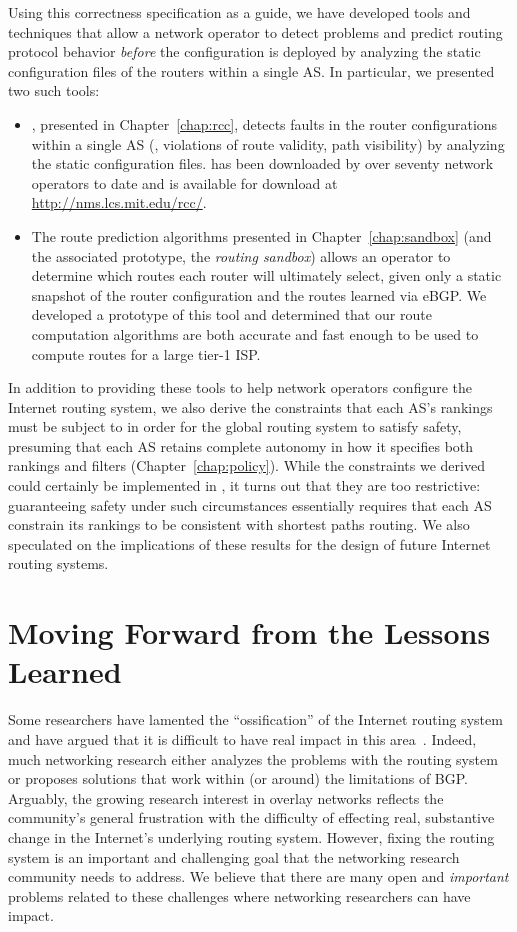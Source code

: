 Using this correctness specification as a guide, we have developed tools
and techniques that allow a network operator to detect problems and
predict routing protocol behavior {\em before} the configuration is deployed by
analyzing the static configuration files of the routers within a single
AS.  In particular, we presented two such tools:

\begin{itemize}
\itemsep=-1pt
\item \rcc, presented in Chapter~\ref{chap:rcc}, detects faults in the router
configurations within a single 
AS (\ie, violations of route validity, path visibility) by
analyzing the static configuration files.  \rcc has been downloaded by
over seventy network operators to date and is available for download at
\url{http://nms.lcs.mit.edu/rcc/}.
%
\item The route prediction algorithms presented in
Chapter~\ref{chap:sandbox} (and the associated prototype, the {\em routing
sandbox}) allows an operator to determine which routes each router will
ultimately select, given only a static snapshot of the router
configuration and the routes learned via eBGP.  We developed a prototype
of this tool and determined that our route computation algorithms are
both accurate and fast enough to be used to compute routes for a large
tier-1 ISP. 
\end{itemize}

In addition to providing these tools to help network operators
configure the Internet routing system, we also derive the constraints
that each AS's 
rankings must be subject to in order for the global routing system to
satisfy safety, presuming that each AS
retains complete autonomy in how it specifies both rankings and filters
(Chapter~\ref{chap:policy}). 
While the constraints we derived could certainly be implemented in \rccns, it
turns out that they are too restrictive: guaranteeing safety under such
circumstances essentially requires that each AS constrain its rankings
to be consistent with shortest paths routing.  We also speculated on the
implications of these results for the design of future Internet routing
systems. 

\section{Moving Forward from the Lessons Learned}\label{sec:concl:lessons}

Some researchers have lamented the ``ossification'' of the Internet
routing system and have argued that it is difficult to have real impact in
this area~\cite{Peterson2004}.  Indeed, much networking research either
analyzes the problems with the routing system or proposes solutions that
work within (or around) the limitations of BGP.  Arguably, the growing
research interest in overlay networks reflects the community's general
frustration with the difficulty of effecting real, substantive change in
the Internet's underlying routing system.  However, fixing the routing
system is an important and challenging goal that the networking research
community needs to address.  We believe that there are many open and
{\em important} problems related to these challenges where networking
researchers can have impact.


